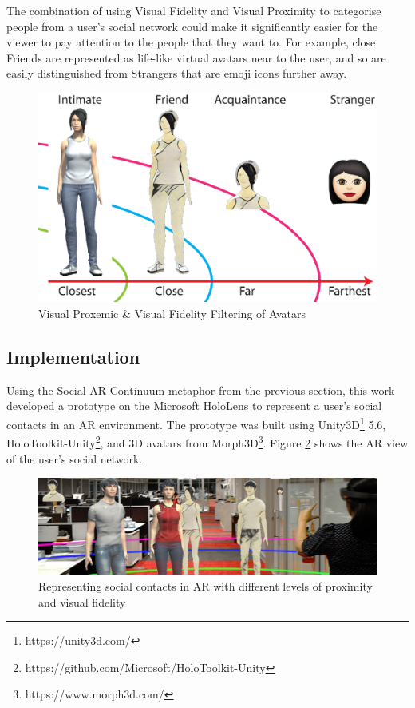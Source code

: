 The combination of using Visual Fidelity and Visual Proximity to categorise people from a user's social network could make it significantly easier for the viewer to pay attention to the people that they want to. For example, close Friends are represented as life-like virtual avatars near to the user, and so are easily distinguished from Strangers that are emoji icons further away.

\begin{figure}[h]
  \centering
  \includegraphics[width=0.8\linewidth]{images/41-visualising-mgia17/writing-images-11.eps}
  \caption{Visual Proxemic \& Visual Fidelity Filtering of Avatars}
    \label{fig:contacts:proximic-circles}
\end{figure}



\subsection{Implementation}

Using the Social AR Continuum metaphor from the previous section, this work developed a prototype on the Microsoft HoloLens to represent a user's social contacts in an AR environment. The prototype was built using Unity3D\footnote{https://unity3d.com/} 5.6, HoloToolkit-Unity\footnote{https://github.com/Microsoft/HoloToolkit-Unity}, and 3D avatars from Morph3D\footnote{https://www.morph3d.com/}. Figure \ref{fig:contacts:overview} shows the AR view of the user's social network.

\begin{figure}[h]
  \includegraphics[width=\linewidth]{images/41-visualising-mgia17/20170618_031128_HoloLens_cropped.jpg}
  \caption{Representing social contacts in AR with different levels of proximity and visual fidelity}
  \label{fig:contacts:overview}
\end{figure}

